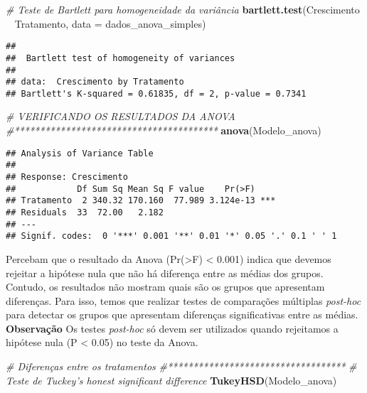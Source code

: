 \documentclass[
]{book}
\newenvironment{Shaded}{\begin{snugshade}}{\end{snugshade}}
\newcommand{\CommentTok}[1]{\textcolor[rgb]{0.56,0.35,0.01}{\textit{#1}}}
\newcommand{\DataTypeTok}[1]{\textcolor[rgb]{0.13,0.29,0.53}{#1}}
\newcommand{\KeywordTok}[1]{\textcolor[rgb]{0.13,0.29,0.53}{\textbf{#1}}}
\newcommand{\NormalTok}[1]{#1}
\newcommand{\OperatorTok}[1]{\textcolor[rgb]{0.81,0.36,0.00}{\textbf{#1}}}
\newcommand{\StringTok}[1]{\textcolor[rgb]{0.31,0.60,0.02}{#1}}
\begin{document}
\begin{Shaded}
\begin{Highlighting}[]
\CommentTok{# Teste de Bartlett para homogeneidade da variância}
\KeywordTok{bartlett.test}\NormalTok{(Crescimento }\OperatorTok{~}\StringTok{ }\NormalTok{Tratamento, }\DataTypeTok{data =}\NormalTok{ dados_anova_simples)}
\end{Highlighting}
\end{Shaded}

\begin{verbatim}
## 
## 	Bartlett test of homogeneity of variances
## 
## data:  Crescimento by Tratamento
## Bartlett's K-squared = 0.61835, df = 2, p-value = 0.7341
\end{verbatim}

\begin{Shaded}
\begin{Highlighting}[]
\CommentTok{# VERIFICANDO OS RESULTADOS DA ANOVA}
\CommentTok{#****************************************}
\KeywordTok{anova}\NormalTok{(Modelo_anova)}
\end{Highlighting}
\end{Shaded}

\begin{verbatim}
## Analysis of Variance Table
## 
## Response: Crescimento
##            Df Sum Sq Mean Sq F value    Pr(>F)    
## Tratamento  2 340.32 170.160  77.989 3.124e-13 ***
## Residuals  33  72.00   2.182                      
## ---
## Signif. codes:  0 '***' 0.001 '**' 0.01 '*' 0.05 '.' 0.1 ' ' 1
\end{verbatim}

Percebam que o resultado da Anova (Pr(\textgreater F) \textless{} 0.001) indica que devemos rejeitar a hipótese nula que não há diferença entre as médias dos grupos. Contudo, os resultados não mostram quais são os grupos que apresentam diferenças. Para isso, temos que realizar testes de comparações múltiplas \emph{post-hoc} para detectar os grupos que apresentam diferenças significativas entre as médias. \textbf{Observação} Os testes \emph{post-hoc} só devem ser utilizados quando rejeitamos a hipótese nula (P \textless{} 0.05) no teste da Anova.

\begin{Shaded}
\begin{Highlighting}[]
\CommentTok{# Diferenças entre os tratamentos}
\CommentTok{#***********************************}
\CommentTok{# Teste de Tuckey's honest significant difference}
\KeywordTok{TukeyHSD}\NormalTok{(Modelo_anova)}
\end{Highlighting}
\end{Shaded}
\end{document}
